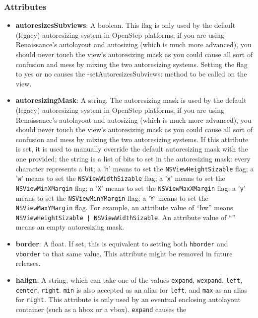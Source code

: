 \subsubsection{Attributes}
\begin{itemize}
\item {\bf autoresizesSubviews}: A boolean.  This flag is only used by
  the default (legacy) autoresizing system in OpenStep platforms; if
  you are using Renaissance's autolayout and autosizing (which is much
  more advanced), you should never touch the view's autoresizing mask
  as you could cause all sort of confusion and mess by mixing the two
  autoresizing systems.  Setting the flag to yes or no causes the
  -setAutoresizesSubviews: method to be called on the view.
\item {\bf autoresizingMask}: A string.  The autoresizing mask is used
  by the default (legacy) autoresizing system in OpenStep platforms;
  if you are using Renaissance's autolayout and autosizing (which is
  much more advanced), you should never touch the view's autoresizing
  mask as you could cause all sort of confusion and mess by mixing the
  two autoresizing systems.  If this attribute is set, it is used to
  manually override the default autoresizing mask with the one
  provided; the string is a list of bits to set in the autoresizing
  mask: every character represents a bit; a '\texttt{h}' means to set
  the \texttt{NSViewHeightSizable} flag; a '\texttt{w}' means to set
  the \texttt{NSViewWidthSizable} flag; a '\texttt{x}' means to set
  the \texttt{NSViewMinXMargin} flag; a '\texttt{X}' means to set the
  \texttt{NSViewMaxXMargin} flag; a '\texttt{y}' means to set the
  \texttt{NSViewMinYMargin} flag; a '\texttt{Y}' means to set the
  \texttt{NSViewMaxYMargin} flag.  For example, an attribute value of
  ``hw'' means \texttt{NSViewHeightSizable | NSViewWidthSizable}.  An
  attribute value of ``'' means an empty autoresizing mask.
\item {\bf border}: A float.  If set, this is equivalent to setting
  both \texttt{hborder} and \texttt{vborder} to that same value.  This
  attribute might be removed in future releases.
\item {\bf halign}: A string, which can take one of the values
  \texttt{expand}, \texttt{wexpand}, \texttt{left}, \texttt{center},
  \texttt{right}.  \texttt{min} is also accepted as an alias for
  \texttt{left}, and \texttt{max} as an alias for \texttt{right}.
  This attribute is only used by an eventual enclosing autolayout
  container (such as a hbox or a vbox).  \texttt{expand} causes the

\end{itemize}
